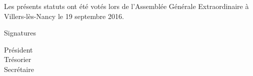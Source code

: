 \documentclass{article} %
\begin{document}
	\clearpage
	\vspace*{5cm}
	\begin{center}
		{\large\light Les présents statuts ont été votés lors de l’Assemblée Générale
		Extraordinaire à Villers-lès-Nancy le 19 septembre 2016.}
	\end{center}
    \vspace{3cm}
	Signatures\par
	\begin{multicols}{3}
	    \begin{center}
	        Président \\
	        Trésorier \\
	        Secrétaire
	    \end{center}
	\end{multicols}
    
\end{document}

